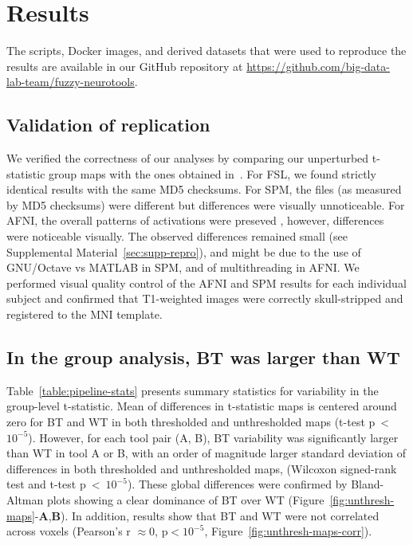 \documentclass[11pt,onecolumn]{article}
\begin{document}
\section{Results}
The scripts, Docker images, and derived datasets that were used to reproduce the results are available
in our GitHub repository at \url{https://github.com/big-data-lab-team/fuzzy-neurotools}.

\subsection{Validation of replication}

We verified the correctness of our analyses by comparing our unperturbed
t-statistic group maps with the ones obtained
in~\cite{bowring2019exploring}. For FSL, we found
strictly identical results with the same MD5 checksums. For SPM, the files (as measured by MD5 checksums) were different but differences
were visually unnoticeable. For AFNI, the overall patterns of activations were preseved
, however, differences were noticeable visually.
The observed differences remained small (see Supplemental Material~\ref{sec:supp-repro}), and might be due to the use of
GNU/Octave vs MATLAB in SPM, and of multithreading in AFNI. We performed visual quality control of the AFNI
and SPM results for each individual subject and confirmed that T1-weighted images were
correctly skull-stripped and registered to the MNI template.

\subsection{In the group analysis, BT was larger than WT}

Table~\ref{table:pipeline-stats} presents summary statistics for variability in the
group-level t-statistic.
Mean of differences in t-statistic maps is centered around zero for BT and WT
in both thresholded and unthresholded maps (t-test p~\textless~$10^{-5}$).
However, for each tool pair (A, B), BT variability was
significantly larger than WT in tool A or B,
with an order of magnitude larger standard deviation of differences 
in both thresholded and unthresholded maps, 
(Wilcoxon signed-rank test and t-test p~\textless~$10^{-5}$).
These global differences were confirmed by Bland-Altman plots showing a
clear dominance of BT over WT
(Figure~\ref{fig:unthresh-maps}-\textbf{A},\textbf{B}).
In addition, results show that BT and WT were not correlated across voxels
(Pearson's r $\approx 0$, p$< 10^{-5}$, Figure~\ref{fig:unthresh-maps-corr}).
\end{document}
